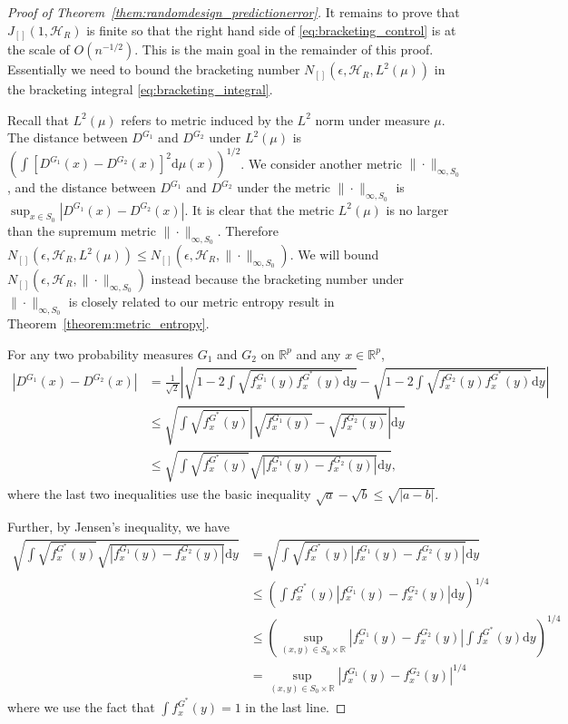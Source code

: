 \documentclass[11pt]{article}
\numberwithin{equation}{section}
\newcommand{\RS}{\mathbb{R}}
\newcommand{\diff}{\mathrm{d}} %
\begin{document}
\begin{appendices}
\begin{proof}[Proof of Theorem~\ref{them:randomdesign_predictionerror}]
It remains to prove that $J_{[]}(1,\mathcal{H}_R)$ is finite so that the right hand side of \eqref{eq:bracketing_control} is at the scale of $O(n^{-1/2})$. This is the main goal in the remainder of this proof. Essentially we need to bound the bracketing number $N_{[]}(\epsilon, \mathcal{H}_R, L^2(\mu))$ in the bracketing integral \eqref{eq:bracketing_integral}. 

Recall that $L^2(\mu)$ refers to metric induced by the $L^2$ norm under measure $\mu$. The distance between $D^{G_1}$ and $D^{G_2}$ under $L^2(\mu)$ is $\displaystyle \left(\int [D^{G_1}(x)  -D^{G_2}(x) ]^2 \diff \mu(x)\right)^{1/2}$. We consider another metric $\| \cdot\|_{\infty,S_0}$, and the distance between $D^{G_1}$ and $D^{G_2}$ under the metric $\| \cdot\|_{\infty,S_0}$ is $\displaystyle  \sup_{x\in S_0} |D^{G_1}(x) - D^{G_2}(x)|$. It is clear that the metric $L^2 (\mu)$ is no larger than the supremum metric $\| \cdot\|_{\infty,S_0}$. Therefore 
$N_{[]}(\epsilon, \mathcal{H}_R, L^2(\mu)) \leq N_{[]}(\epsilon, \mathcal{H}_R, \| \cdot\|_{\infty,S_0})$.
We will bound $N_{[]}(\epsilon, \mathcal{H}_R, \| \cdot\|_{\infty,S_0})$ instead because the bracketing number under $\| \cdot\|_{\infty,S_0}$ is closely related to our metric entropy result in Theorem~\ref{theorem:metric_entropy}.


For any two probability measures $G_1$ and $G_2$ on $\RS^p$ and any $x \in \RS^p$,
\begin{equation}
\begin{split}
|D^{G_1}(x) - D^{G_2}(x)| & =\frac{1}{\sqrt{2}}
\left| \sqrt{1- 2 \int \sqrt{f^{G_1}_x(y) f^{G^*}_x(y)}\mathrm{d} y}  - \sqrt{1- 2 \int \sqrt{f^{G_2}_x(y) f^{G^*}_x(y)}\mathrm{d} y}  \right|\\
& \leq \sqrt{\int \sqrt{f^{G^*}_x(y)} \left|\sqrt{f^{G_1}_x(y)} - \sqrt{f^{G_2}_x(y)} \right| \mathrm{d} y}\\
& \leq\sqrt{ \int \sqrt{f^{G^*}_x(y)} \sqrt{|f^{G_1}_x(y) - f^{G_2}_x(y)|} \mathrm{d} y},
\end{split}
\label{eq:bracket_expand}
\end{equation}
where the last two inequalities use the basic inequality $\sqrt{a} - \sqrt{b} \leq \sqrt{|a-b|}$.

Further, by Jensen's inequality, we have
\begin{equation}
\begin{split}
\sqrt{ \int \sqrt{f^{G^*}_x(y)} \sqrt{|f^{G_1}_x(y) - f^{G_2}_x(y)|} \mathrm{d} y} & = \sqrt{ \int \sqrt{f^{G^*}_x(y)|f^{G_1}_x(y) - f^{G_2}_x(y)|} \mathrm{d} y}\\
&\leq 
\left( \int f^{G^*}_x(y) |f^{G_1}_x(y) - f^{G_2}_x(y)| \mathrm{d} y \right)^{1/4}\\
&\leq ( \sup_{(x,y) \in S_0 \times \RS} |f^{G_1}_x(y) - f^{G_2}_x(y)|\int  f^{G^*}_x(y) \mathrm{d} y )^{1/4}\\
& = \sup_{(x,y)\in S_0 \times \RS} |f^{G_1}_x(y) - f^{G_2}_x(y)|^{1/4}
\end{split}
\label{eq:entropy_to_bracketing}
\end{equation}
where we use the fact that $\int f^{G^*}_x(y) = 1$ in the last line.


\end{proof}
\end{appendices}
\end{document}
